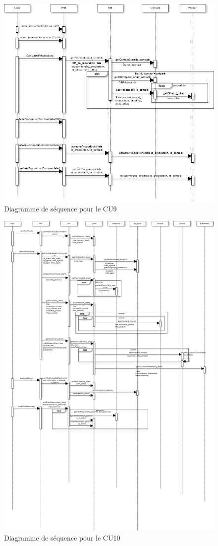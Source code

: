 \begin{figure}[H]
	\begin{center}
		\includegraphics[scale=0.4]{Includes/SOA-Sequence-CU9.png}
		\caption{Diagramme de séquence pour le CU9}
	\end{center}
\end{figure}

\begin{figure}[H]
	\begin{center}
		\includegraphics[scale=0.4]{Includes/SOA-Sequence-CU10.png}
		\caption{Diagramme de séquence pour le CU10}
	\end{center}
\end{figure}
